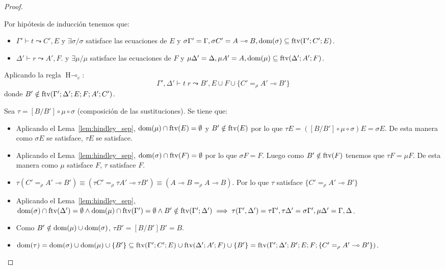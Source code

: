 \begin{proof}
\begin{itemize}
Por hipótesis de inducción tenemos que:
\begin{itemize}
    \item $\Gamma'\vdash t \leadsto C',E$ y $\exists \sigma / \sigma$ satisface las ecuaciones de $E$ y $\sigma \Gamma' = \Gamma, \sigma C'=A\multimap B, \text{dom}(\sigma)\subseteq \text{ftv}(\Gamma';C';E)$.
    \item $\Delta'\vdash r \leadsto A',F$. y $\exists \mu / \mu$ satisface las ecuaciones de $F$ y $\mu \Delta' = \Delta, \mu A'= A, \text{dom}(\mu)\subseteq \text{ftv}(\Delta';A';F)$.
\end{itemize}

Aplicando la regla $\text{H}\multimap_e$:
\[\Gamma',\Delta' \vdash t\;r \leadsto B', E \cup F \cup \{C'=_\rho A'\multimap B'\}\]
donde $B'\notin \text{ftv}(\Gamma';\Delta';E;F;A';C')$.
 
Sea $\tau = [B/B'] \circ \mu \circ \sigma$ (composición de las sustituciones). Se tiene que:
   
\begin{itemize}
    \item Aplicando el Lema~\ref{lem:hindley_sep}, $\text{dom}(\mu)\cap\text{ftv}(E)=\emptyset$ y $B'\notin \text{ftv}(E)$ por lo que $\tau E = ([B/B'] \circ \mu\circ \sigma)E=\sigma E$. De esta manera como $\sigma E$ se satisface, $\tau E$ se satisface.
    \item Aplicando el Lema~\ref{lem:hindley_sep}, $\text{dom}(\sigma)\cap\text{ftv}(F)=\emptyset$ por lo que $\sigma F=F$. Luego como $B'\notin \text{ftv}(F)$ tenemos que $\tau F=\mu F$. De esta manera como $\mu$ satisface $F$, $\tau$ satisface $F$.
    \item $\tau (C' =_\rho A'\multimap B') \equiv (\tau C' =_\rho \tau A' \multimap \tau B') \equiv (A\multimap B =_\rho A \multimap B)$. Por lo que $\tau$ satisface $\{C' =_\rho A'\multimap B'\}$
    \item Aplicando el Lema~\ref{lem:hindley_sep}, $\text{dom}(\sigma)\cap \text{ftv}(\Delta')=\emptyset  \wedge \text{dom}(\mu)\cap \text{ftv}(\Gamma')=\emptyset \wedge B'\notin \text{ftv}(\Gamma';\Delta') \implies \tau (\Gamma', \Delta') = \tau \Gamma', \tau \Delta' = \sigma \Gamma', \mu \Delta' = \Gamma, \Delta$.
    \item Como $B' \notin \text{dom}(\mu)\cup\text{dom}(\sigma)$, $\tau B' = [B/B']B' = B$.
    \item $ \text{dom}(\tau) = \text{dom}(\sigma)\cup\text{dom}(\mu)\cup\{B'\} \subseteq \text{ftv}(\Gamma';C';E)\cup\text{ftv}(\Delta';A';F)\cup\{B'\} =\text{ftv}(\Gamma';\Delta';B';E;F;\{C'=_\rho A'\multimap B'\})$.
\end{itemize}


\end{itemize}
\end{proof}
